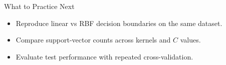 \documentclass[10pt]{beamer}
\begin{document}
\begin{frame}{What to Practice Next}
  \justifying
  \begin{itemize}
    \item Reproduce linear vs RBF decision boundaries on the same dataset.
    \item Compare support-vector counts across kernels and $C$ values.
    \item Evaluate test performance with repeated cross-validation.
  \end{itemize}
\end{frame}
\end{document}
